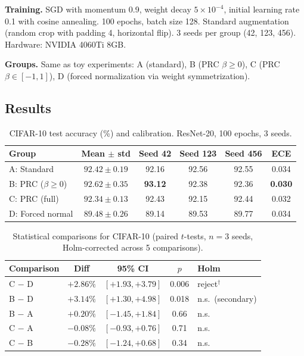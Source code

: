 \documentclass[11pt,a4paper]{article}
\theoremstyle{definition}
\begin{document}
\textbf{Training.} SGD with momentum 0.9, weight decay $5 \times 10^{-4}$,
initial learning rate 0.1 with cosine annealing. 100 epochs, batch size
128. Standard augmentation (random crop with padding 4, horizontal flip).
3 seeds per group (42, 123, 456). Hardware: NVIDIA 4060Ti 8GB.

\textbf{Groups.} Same as toy experiments: A (standard), B (PRC $\beta \geq 0$),
C (PRC $\beta \in [-1,1]$), D (forced normalization via weight symmetrization).

\subsection{Results}

\begin{table}[ht]
\centering
\caption{CIFAR-10 test accuracy (\%) and calibration. ResNet-20, 100 epochs, 3 seeds.}
\label{tab:cifar}
\begin{tabular}{@{}lccccc@{}}
\toprule
Group & Mean $\pm$ std & Seed 42 & Seed 123 & Seed 456 & ECE \\
\midrule
A: Standard       & $92.42 \pm 0.19$ & 92.16 & 92.56 & 92.55 & 0.034 \\
B: PRC ($\beta \geq 0$)  & $92.62 \pm 0.35$ & \textbf{93.12} & 92.38 & 92.36 & \textbf{0.030} \\
C: PRC (full)     & $92.34 \pm 0.13$ & 92.43 & 92.15 & 92.44 & 0.032 \\
D: Forced normal  & $89.48 \pm 0.26$ & 89.14 & 89.53 & 89.77 & 0.034 \\
\bottomrule
\end{tabular}
\end{table}

\begin{table}[ht]
\centering
\caption{Statistical comparisons for CIFAR-10 (paired $t$-tests,
$n = 3$ seeds, Holm-corrected across 5 comparisons).}
\label{tab:cifar-stats}
\begin{tabular}{@{}lcccl@{}}
\toprule
Comparison & Diff & 95\% CI & $p$ & Holm \\
\midrule
C $-$ D & $+2.86\%$ & $[+1.93, +3.79]$ & 0.006 & reject$^\dagger$ \\
B $-$ D & $+3.14\%$ & $[+1.30, +4.98]$ & 0.018 & n.s.\ (secondary) \\
B $-$ A & $+0.20\%$ & $[-1.45, +1.84]$ & 0.66  & n.s. \\
C $-$ A & $-0.08\%$ & $[-0.93, +0.76]$ & 0.71  & n.s. \\
C $-$ B & $-0.28\%$ & $[-1.24, +0.68]$ & 0.34  & n.s. \\
\bottomrule
\end{tabular}
\end{table}
\end{document}

